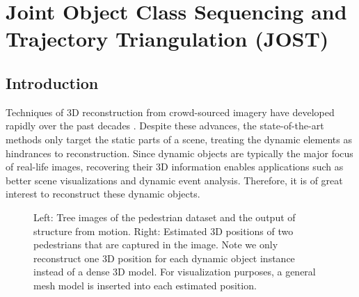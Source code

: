 \chapter{Joint Object Class Sequencing and Trajectory Triangulation (JOST)} \label{ch:jost}

\section{Introduction}

Techniques of 3D reconstruction from crowd-sourced imagery have developed rapidly over the past decades \cite{agarwal2011building,Frahm2010,zheng2014patchmatch,Heinly}. 
Despite these advances, the state-of-the-art methods only target the static parts of a scene, treating the dynamic elements as hindrances to reconstruction. Since dynamic objects are typically the major focus of real-life images, recovering their 3D information enables applications such as better scene visualizations and dynamic event analysis. Therefore, it is of great interest to reconstruct these dynamic objects.

\begin{figure}
\centering
{}
\caption[Example input and output of JOST.]{Left: Tree images of the pedestrian dataset and the output of structure from motion. Right: Estimated 3D positions of two pedestrians that are captured in the image. Note we only reconstruct one 3D position for each dynamic object instance instead of a dense 3D model. For visualization purposes, a general mesh model is inserted into each estimated position.}
\vspace*{-0.5cm}
\end{figure}

